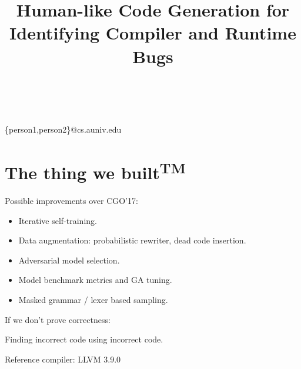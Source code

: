 


        
\title{Human-like Code Generation for Identifying Compiler and Runtime Bugs}

%
%
{ \\
          \\
        }
{\{person1,person2\}@cs.auniv.edu}

\maketitle






\section{The thing we built\textsuperscript{TM}}

Possible improvements over CGO'17:

\begin{itemize}
        \item Iterative self-training.
        \item Data augmentation: probabilistic rewriter, dead code insertion.
        \item Adversarial model selection.
        \item Model benchmark metrics and GA tuning.
        \item Masked grammar / lexer based sampling.
\end{itemize}

\noindent If we don't prove correctness:

Finding incorrect code using incorrect code.

Reference compiler: LLVM 3.9.0

